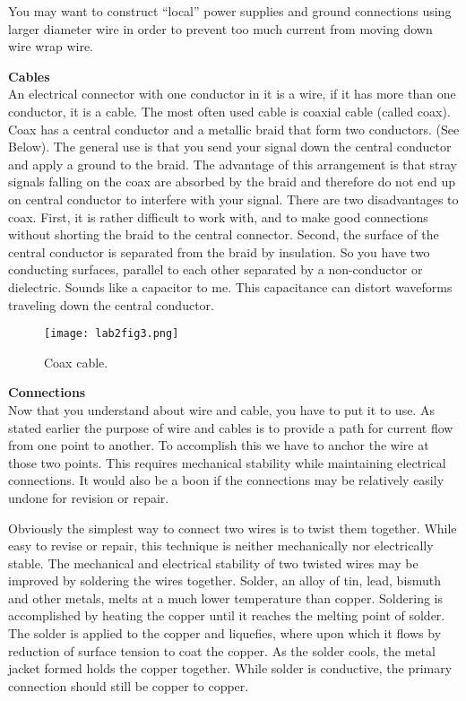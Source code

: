 \documentclass[12pt]{article}
\begin{document}
\begin{enumerate}[1.]
You may want to construct ``local'' power supplies and ground connections using larger diameter wire in order to prevent too much current from moving down wire wrap wire.

{\bf Cables}\\
An electrical connector with one conductor in it is a wire, if it has more than one conductor, it is a cable. The most often used cable is coaxial cable (called coax). Coax has a central conductor and a metallic braid that form two conductors. (See Below). The general use is that you send your signal down the central conductor and apply a ground to the braid. The advantage of this arrangement is that stray signals falling on the coax are absorbed by the braid and therefore do not end up on central conductor to interfere with your signal. There are two disadvantages to coax. First, it is rather difficult to work with, and to make good connections without
shorting the braid to the central connector. Second, the surface of the central conductor is separated from the braid by insulation. So you have two conducting surfaces, parallel to each other separated by a non-conductor or dielectric. Sounds like a capacitor to me. This capacitance can distort waveforms traveling down the central conductor.

\begin{figure}[!ht]
\begin{center}
\texttt{[image: lab2fig3.png]}
\caption*{Coax cable.}
\end{center}
\end{figure}

{\bf Connections}\\
Now that you understand about wire and cable, you have to put it to use. 
As stated earlier the purpose of wire and cables
is to provide a path for current flow from one point to another. 
To accomplish this we have to anchor the wire at those two points. 
This requires mechanical stability while maintaining electrical connections. 
It would also be a boon if the connections may be relatively easily undone for revision or repair.

\par Obviously the simplest way to connect two wires is to twist them together. 
While easy to revise or repair, this technique is neither mechanically nor electrically stable. 
The mechanical and electrical stability of two twisted wires may be improved by soldering the wires together. 
Solder, an alloy of tin, lead, bismuth and other metals, melts at a much lower temperature than copper. 
Soldering is accomplished by heating the copper until it reaches the melting point of solder. 
The solder is applied to the copper and liquefies, where upon which it flows by reduction of surface tension to coat the copper. 
As the solder cools, the metal jacket formed holds the copper together. 
While solder is conductive, the primary connection should still be copper to copper.


\end{enumerate}
\end{document}
